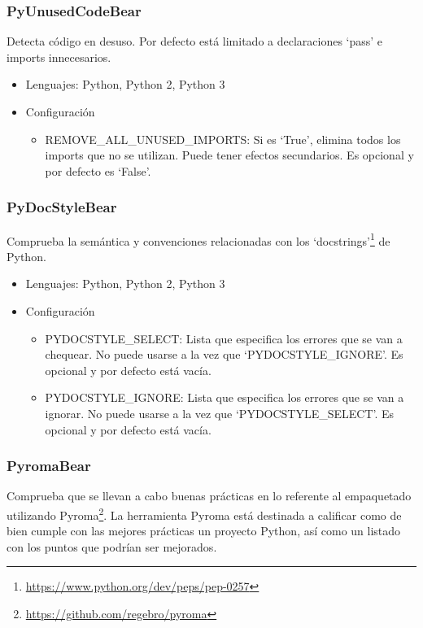 \documentclass[a4paper, 12pt]{book}
\begin{document}
\subsubsection{PyUnusedCodeBear}
\label{sec:seccion1.2.11}
Detecta código en desuso. Por defecto está limitado a declaraciones `pass' e imports innecesarios.

\begin{itemize}
  \item Lenguajes: Python, Python 2, Python 3
  \item Configuración
    \begin{itemize}
          \item REMOVE\_ALL\_UNUSED\_IMPORTS: Si es `True', elimina todos los imports que no se utilizan. Puede tener efectos secundarios. Es opcional y por defecto es `False'.
    \end{itemize}
\end{itemize}

\subsubsection{PyDocStyleBear}
\label{sec:seccion1.2.12}
Comprueba la semántica y convenciones relacionadas con los `docstrings'\footnote{\url{https://www.python.org/dev/peps/pep-0257}} de Python.

\begin{itemize}
  \item Lenguajes: Python, Python 2, Python 3
  \item Configuración
    \begin{itemize}
          \item PYDOCSTYLE\_SELECT: Lista que especifica los errores que se van a chequear. No puede usarse a la vez que `PYDOCSTYLE\_IGNORE'. Es opcional y por defecto está vacía.
          \item PYDOCSTYLE\_IGNORE: Lista que especifica los errores que se van a ignorar. No puede usarse a la vez que `PYDOCSTYLE\_SELECT'. Es opcional y por defecto está vacía.
    \end{itemize}
\end{itemize}

\subsubsection{PyromaBear}
\label{sec:seccion1.2.13}
Comprueba que se llevan a cabo buenas prácticas en lo referente al empaquetado utilizando Pyroma\footnote{\url{https://github.com/regebro/pyroma}}. La herramienta Pyroma está destinada a calificar como de bien cumple con las mejores prácticas un proyecto Python, así como un listado con los puntos que podrían ser mejorados.
\end{document}
